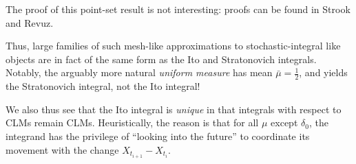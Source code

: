 \documentclass{scrartcl}
\begin{document}
The proof of this point-set result is not interesting: proofs can be found in Strook\cite{STROOCK_2019} and Revuz\cite{RevuzYor1999}.

Thus, large families of such mesh-like approximations to stochastic-integral like objects are in fact of the same form as the Ito and Stratonovich integrals. Notably, the arguably more natural \emph{uniform measure} has mean $\bar{\mu} = \frac12$, and yields the Stratonovich integral, not the Ito integral!

We also thus see that the Ito integral is \emph{unique} in that integrals with respect to CLMs remain CLMs. Heuristically, the reason is that for all $\mu$ except $\delta_0$, the integrand has the privilege of ``looking into the future'' to coordinate its movement with the change $X_{t_{i+1}} - X_{t_i}$.







\end{document}
